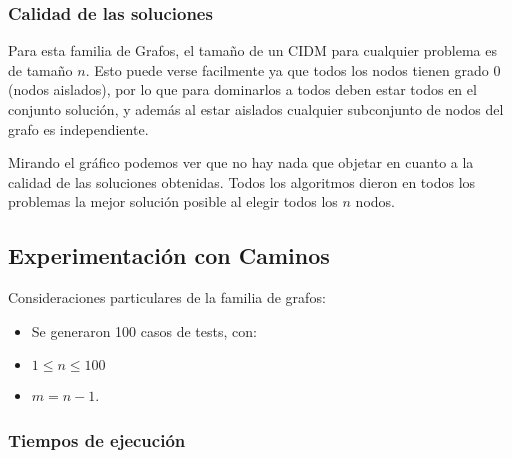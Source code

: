 \subsubsection{Calidad de las soluciones}
\begin{center}
\end{center}

Para esta familia de Grafos, el tamaño de un CIDM para cualquier problema es de tamaño $n$. Esto puede verse facilmente ya que todos los nodos tienen grado $0$ (nodos aislados), por lo que para dominarlos a todos deben estar todos en el conjunto solución, y además al estar aislados cualquier subconjunto de nodos del grafo es independiente.

Mirando el gráfico podemos ver que no hay nada que objetar en cuanto a la calidad de las soluciones obtenidas. Todos los algoritmos dieron en todos los problemas la mejor solución posible al elegir todos los $n$ nodos.

\subsection{Experimentación con Caminos}

Consideraciones particulares de la familia de grafos:
\begin{itemize}
    \item Se generaron 100 casos de tests, con:
    \item $1 \leq n \leq 100$
    \item $m = n-1$.
\end{itemize}

\subsubsection{Tiempos de ejecución}

